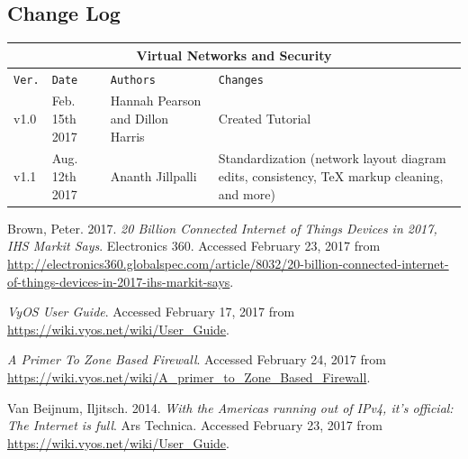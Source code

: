 \documentclass[12pt]{article}
\begin{document}
\subsection*{Change Log}
\label{changelog}
\vspace{6mm}


\begin{tabular}{ |p{1cm}|p{3cm}|p{4cm}|p{7cm}| }
\hline
\multicolumn{4}{|c|}{Virtual Networks and Security} \\ \hline
\texttt{Ver.} & \texttt{Date} & \texttt{Authors} & \texttt{Changes} \\ \hline
v1.0 & Feb. 15th 2017 & Hannah Pearson and Dillon Harris & Created Tutorial  \\ \hline
v1.1 & Aug. 12th 2017 & Ananth Jillpalli & Standardization (network layout diagram edits, consistency, TeX markup cleaning, and more)  \\ \hline
\end{tabular}


\pagebreak



\begin{thebibliography}{9}

	Brown, Peter.
    2017.
    \textit{20 Billion Connected Internet of Things Devices in 2017, IHS Markit Says}.
    Electronics 360.
    Accessed February 23, 2017 from 	\url{http://electronics360.globalspec.com/article/8032/20-billion-connected-internet-of-things-devices-in-2017-ihs-markit-says}.


\textit{VyOS User Guide}. Accessed February 17, 2017 from 
\url{https://wiki.vyos.net/wiki/User\_Guide}.

	\textit{A Primer To Zone Based Firewall}.
	Accessed February 24, 2017 from
	\url{https://wiki.vyos.net/wiki/A_primer_to_Zone_Based_Firewall}.
    
    
	Van Beijnum, Iljitsch.
    2014.
    \textit{With the Americas running out of IPv4, it’s official: The Internet is full}. Ars Technica. Accessed February 23, 2017 from
\url{https://wiki.vyos.net/wiki/User\_Guide}.

\end{thebibliography}
\end{document}
